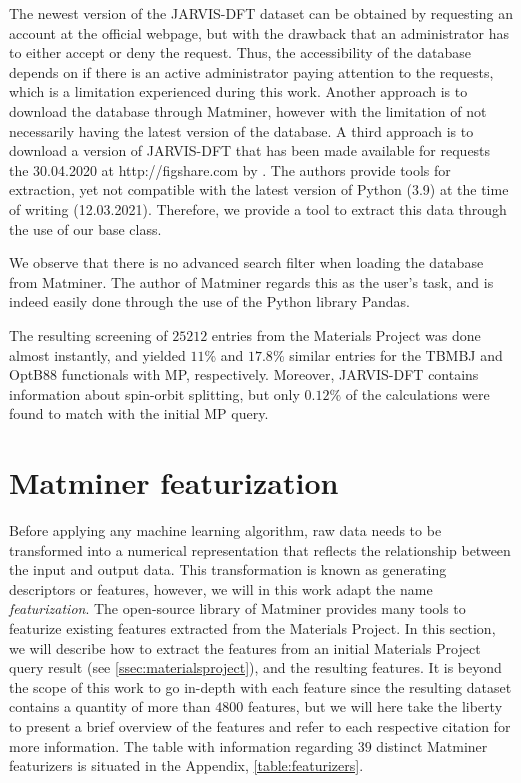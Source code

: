 The newest version of the JARVIS-DFT dataset can be obtained by requesting an account at the official webpage, but with the drawback that an administrator has to either accept or deny the request. Thus, the accessibility of the database depends on if there is an active administrator paying attention to the requests, which is a limitation experienced during this work. Another approach is to download the database through Matminer, however with the limitation of not necessarily having the latest version of the database. A third approach is to download a version of JARVIS-DFT that has been made available for requests the 30.04.2020 at http://figshare.com by \citeauthor{Choudhary2020} \cite{Choudhary2020}. The authors provide tools for extraction, yet not compatible with the latest version of Python (3.9) at the time of writing (12.03.2021). Therefore, we provide a tool to extract this data through the use of our base class.



We observe that there is no advanced search filter when loading the database from Matminer. The author of Matminer regards this as the user's task, and is indeed easily done through the use of the Python library Pandas.

The resulting screening of $25212$ entries from the Materials Project was done almost instantly, and yielded $11$\% and $17.8$\% similar entries for the TBMBJ and OptB88 functionals with MP, respectively. Moreover, JARVIS-DFT contains information about spin-orbit splitting, but only $0.12\%$ of the calculations were found to match with the initial MP query.

\section{Matminer featurization}

Before applying any machine learning algorithm, raw data needs to be transformed into a numerical representation that reflects the relationship between the input and output data. This transformation is known as generating descriptors or features, however, we will in this work adapt the name \textit{featurization}. The open-source library of Matminer provides many tools to featurize existing features extracted from the Materials Project. In this section, we will describe how to extract the features from an initial Materials Project query result (see \autoref{ssec:materialsproject}), and the resulting features. It is beyond the scope of this work to go in-depth with each feature since the resulting dataset contains a quantity of more than $4800$ features, but we will here take the liberty to present a brief overview of the features and refer to each respective citation for more information. The table with information regarding $39$ distinct Matminer featurizers is situated in the Appendix, \autoref{table:featurizers}.

